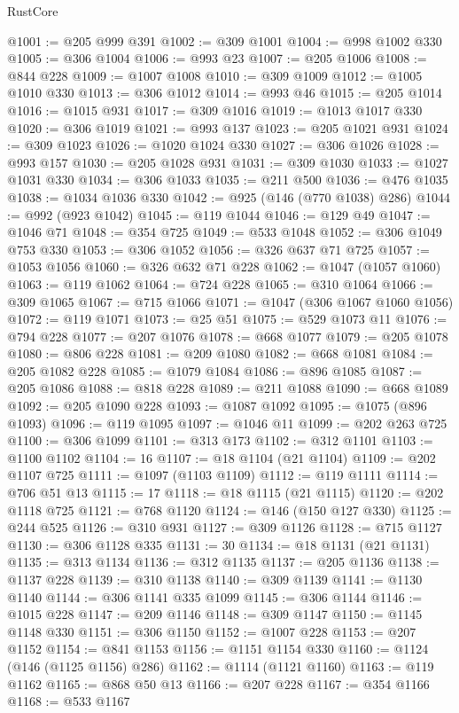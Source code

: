 \begin{lexlean}{RustCore}
\begin{coremodule}
@1001 := @205 @999 @391
@1002 := @309 @1001
@1004 := @998 @1002 @330
@1005 := @306 @1004
@1006 := @993 @23
@1007 := @205 @1006
@1008 := @844 @228
@1009 := @1007 @1008
@1010 := @309 @1009
@1012 := @1005 @1010 @330
@1013 := @306 @1012
@1014 := @993 @46
@1015 := @205 @1014
@1016 := @1015 @931
@1017 := @309 @1016
@1019 := @1013 @1017 @330
@1020 := @306 @1019
@1021 := @993 @137
@1023 := @205 @1021 @931
@1024 := @309 @1023
@1026 := @1020 @1024 @330
@1027 := @306 @1026
@1028 := @993 @157
@1030 := @205 @1028 @931
@1031 := @309 @1030
@1033 := @1027 @1031 @330
@1034 := @306 @1033
@1035 := @211 @500
@1036 := @476 @1035
@1038 := @1034 @1036 @330
@1042 := @925 (@146 (@770 @1038) @286)
@1044 := @992 (@923 @1042)
@1045 := @119 @1044
@1046 := @129 @49
@1047 := @1046 @71
@1048 := @354 @725
@1049 := @533 @1048
@1052 := @306 @1049 @753 @330
@1053 := @306 @1052
@1056 := @326 @637 @71 @725
@1057 := @1053 @1056
@1060 := @326 @632 @71 @228
@1062 := @1047 (@1057 @1060)
@1063 := @119 @1062
@1064 := @724 @228
@1065 := @310 @1064
@1066 := @309 @1065
@1067 := @715 @1066
@1071 := @1047 (@306 @1067 @1060 @1056)
@1072 := @119 @1071
@1073 := @25 @51
@1075 := @529 @1073 @11
@1076 := @794 @228
@1077 := @207 @1076
@1078 := @668 @1077
@1079 := @205 @1078
@1080 := @806 @228
@1081 := @209 @1080
@1082 := @668 @1081
@1084 := @205 @1082 @228
@1085 := @1079 @1084
@1086 := @896 @1085
@1087 := @205 @1086
@1088 := @818 @228
@1089 := @211 @1088
@1090 := @668 @1089
@1092 := @205 @1090 @228
@1093 := @1087 @1092
@1095 := @1075 (@896 @1093)
@1096 := @119 @1095
@1097 := @1046 @11
@1099 := @202 @263 @725
@1100 := @306 @1099
@1101 := @313 @173
@1102 := @312 @1101
@1103 := @1100 @1102
@1104 := 16
@1107 := @18 @1104 (@21 @1104)
@1109 := @202 @1107 @725
@1111 := @1097 (@1103 @1109)
@1112 := @119 @1111
@1114 := @706 @51 @13
@1115 := 17
@1118 := @18 @1115 (@21 @1115)
@1120 := @202 @1118 @725
@1121 := @768 @1120
@1124 := @146 (@150 @127 @330)
@1125 := @244 @525
@1126 := @310 @931
@1127 := @309 @1126
@1128 := @715 @1127
@1130 := @306 @1128 @335
@1131 := 30
@1134 := @18 @1131 (@21 @1131)
@1135 := @313 @1134
@1136 := @312 @1135
@1137 := @205 @1136
@1138 := @1137 @228
@1139 := @310 @1138
@1140 := @309 @1139
@1141 := @1130 @1140
@1144 := @306 @1141 @335 @1099
@1145 := @306 @1144
@1146 := @1015 @228
@1147 := @209 @1146
@1148 := @309 @1147
@1150 := @1145 @1148 @330
@1151 := @306 @1150
@1152 := @1007 @228
@1153 := @207 @1152
@1154 := @841 @1153
@1156 := @1151 @1154 @330
@1160 := @1124 (@146 (@1125 @1156) @286)
@1162 := @1114 (@1121 @1160)
@1163 := @119 @1162
@1165 := @868 @50 @13
@1166 := @207 @228
@1167 := @354 @1166
@1168 := @533 @1167

\end{coremodule}
\end{lexlean}

